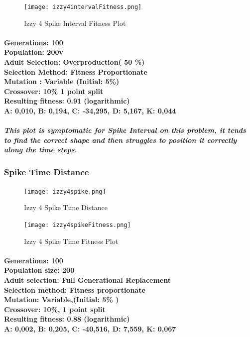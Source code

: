 \documentclass[titlepage,norsk]{article}
\begin{document}
\begin{figure}[h!]
\centering
\texttt{[image: izzy4intervalFitness.png]}
\caption{Izzy 4 Spike Interval Fitness Plot}
\label{fig:awesome_image}
\end{figure}

\paragraph{
Generations: 100\\
Population: 200v\\
Adult Selection: Overproduction( 50 \%)\\
Selection Method: Fitness Proportionate \\
Mutation : Variable (Initial: 5\%)\\
Crossover: 10\% 1 point split \\
Resulting fitness: 0.91 (logarithmic) \\
A: 0,010, B: 0,194, C: -34,295, D: 5,167, K: 0,044 \\
}

\subparagraph{This plot is symptomatic for Spike Interval on this problem, it tends to find the correct shape and then struggles to position it correctly along the time steps.}

\subsubsection{Spike Time  Distance}

\begin{figure}[h!]
\centering
\texttt{[image: izzy4spike.png]}
\caption{Izzy 4 Spike Time Distance}
\label{fig:awesome_image}
\end{figure}

\begin{figure}[h!]
\centering
\texttt{[image: izzy4spikeFitness.png]}
\caption{Izzy 4 Spike Time Fitness Plot}
\label{fig:awesome_image}
\end{figure}

\paragraph{
Generations: 100\\
Population size: 200\\
Adult selection: Full Generational Replacement \\
Selection method: Fitness proportionate\\
Mutation: Variable,(Initial:  5\% )\\
Crossover: 10\%, 1 point split \\
Resulting fitness: 0.88 (logarithmic) \\
 A: 0,002, B: 0,205, C: -40,516, D: 7,559, K: 0,067  \\
}
\end{document}
